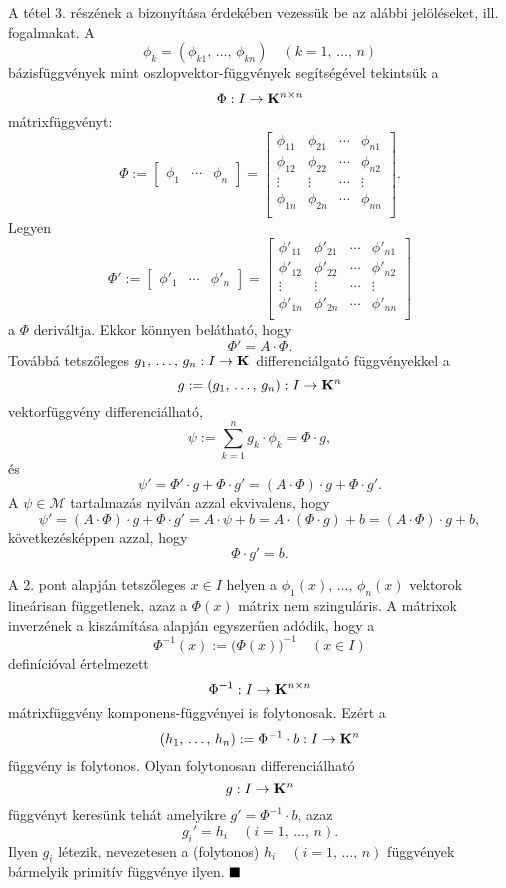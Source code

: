 A tétel 3. részének a bizonyítása érdekében vezessük be az alábbi jelöléseket, ill. fogalmakat. A
\[
	\phi_k = (\phi_{k1}, \, \dots, \, \phi_{kn}) \quad (k = 1, \, \dots, \, n)
\]
bázisfüggvények mint oszlopvektor-függvények segítségével tekintsük a
\[
	\Phi : I \to \mathbf{K}^{n \times n}
\]
mátrixfüggvényt:
\[
	\Phi := \begin{bmatrix}
		\phi_1 & \cdots & \phi_n
	\end{bmatrix} = \begin{bmatrix}
	\phi_{11} & \phi_{21} & \cdots & \phi_{n1} \\
	\phi_{12} & \phi_{22} & \cdots & \phi_{n2} \\
	\vdots & \vdots & \cdots & \vdots \\
	\phi_{1n} & \phi_{2n} & \cdots & \phi_{nn} \\
	\end{bmatrix}.
\]
Legyen
\[
	\Phi' := \begin{bmatrix}
		\phi'_1 & \cdots & \phi'_n
	\end{bmatrix} = \begin{bmatrix}
		\phi'_{11} & \phi'_{21} & \cdots & \phi'_{n1} \\
		\phi'_{12} & \phi'_{22} & \cdots & \phi'_{n2} \\
		\vdots & \vdots & \cdots & \vdots \\
		\phi'_{1n} & \phi'_{2n} & \cdots & \phi'_{nn} \\
	\end{bmatrix}
\]
a $\Phi$ deriváltja. Ekkor könnyen belátható, hogy
\[
	\Phi' = A \cdot \Phi.
\]
Továbbá tetszőleges $g_1, \, \dots, \, g_n : I \to \mathbf{K}$ differenciálgató függvényekkel a
\[
	g := (g_1, \, \dots, \, g_n) : I \to \mathbf{K}^n
\]
vektorfüggvény differenciálható,
\[
	\psi := \sum_{k=1}^n g_k \cdot \phi_k = \Phi \cdot g,
\]
és
\[
	\psi' = \Phi' \cdot g + \Phi \cdot g' = (A \cdot \Phi) \cdot g + \Phi \cdot g'.
\]
A $\psi \in \mathcal{M}$ tartalmazás nyilván azzal ekvivalens, hogy
\[
	\psi' = (A \cdot \Phi) \cdot g + \Phi \cdot g' = A \cdot \psi + b = A \cdot (\Phi \cdot g) + b = (A \cdot \Phi) \cdot g + b,
\] 
következésképpen azzal, hogy
\[
	\Phi \cdot g' = b.
\]

A 2. pont alapján tetszőleges $x \in I$ helyen a $\phi_1(x), \, \dots, \, \phi_n(x)$ vektorok lineárisan függetlenek, azaz a $\Phi(x)$ mátrix nem szinguláris. A mátrixok inverzének a kiszámítása alapján egyszerűen adódik, hogy a
\[
	\Phi^{-1}(x) := \big(\Phi(x)\big)^{-1} \quad (x \in I)
\]
definícióval értelmezett
\[
	\Phi^{-1} : I \to \mathbf{K}^{n \times n}
\]
mátrixfüggvény komponens-függvényei is folytonosak. Ezért a
\[
	(h_1, \, \dots, \, h_n) := \Phi^{-1} \cdot b : I \to \mathbf{K}^n
\]
függvény is folytonos. Olyan folytonosan differenciálható
\[
	g : I \to \mathbf{K}^n
\]
függvényt keresünk tehát amelyikre $g' = \Phi^{-1} \cdot b$, azaz
\[
	g_i' = h_i \quad (i = 1, \, \dots, \, n).
\]
Ilyen $g_i$ létezik, nevezetesen a (folytonos) $h_i \quad (i = 1, \, \dots, \, n)$ függvények bármelyik primitív függvénye ilyen. $\hfill \blacksquare$